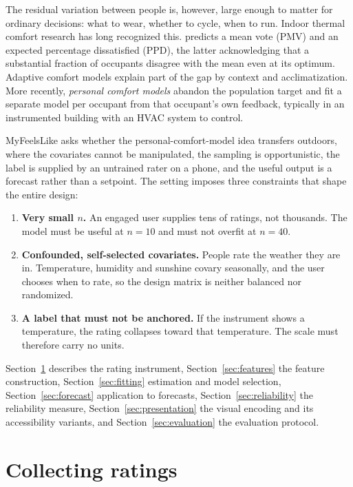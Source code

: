 \documentclass[11pt]{article}
\begin{document}
The residual variation between people is, however, large enough to matter for
ordinary decisions: what to wear, whether to cycle, when to run. Indoor thermal
comfort research has long recognized this. \citet{fanger1970} predicts a mean
vote (PMV) and an expected percentage dissatisfied (PPD), the latter
acknowledging that a substantial fraction of occupants disagree with the mean
even at its optimum. Adaptive comfort models \citep{dedear1998} explain part of
the gap by context and acclimatization. More recently, \emph{personal comfort
models} \citep{kim2018} abandon the population target and fit a separate model
per occupant from that occupant's own feedback, typically in an instrumented
building with an HVAC system to control.

MyFeelsLike asks whether the personal-comfort-model idea transfers outdoors,
where the covariates cannot be manipulated, the sampling is opportunistic, the
label is supplied by an untrained rater on a phone, and the useful output is a
forecast rather than a setpoint. The setting imposes three constraints that
shape the entire design:

\begin{enumerate}
\item \textbf{Very small $n$.} An engaged user supplies tens of ratings, not
      thousands. The model must be useful at $n = 10$ and must not overfit at
      $n = 40$.
\item \textbf{Confounded, self-selected covariates.} People rate the weather
      they are in. Temperature, humidity and sunshine covary seasonally, and
      the user chooses when to rate, so the design matrix is neither balanced
      nor randomized.
\item \textbf{A label that must not be anchored.} If the instrument shows a
      temperature, the rating collapses toward that temperature. The scale must
      therefore carry no units.
\end{enumerate}

Section~\ref{sec:ratings} describes the rating instrument,
Section~\ref{sec:features} the feature construction, Section~\ref{sec:fitting}
estimation and model selection, Section~\ref{sec:forecast} application to
forecasts, Section~\ref{sec:reliability} the reliability measure,
Section~\ref{sec:presentation} the visual encoding and its accessibility
variants, and Section~\ref{sec:evaluation} the evaluation protocol.

\section{Collecting ratings}
\label{sec:ratings}
\end{document}
